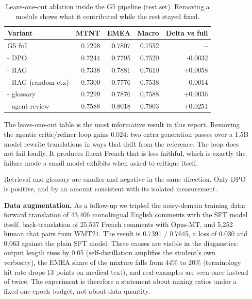 \documentclass[a4paper,12pt,oneside]{article}
\begin{document}
\begin{table}[htbp]
\centering
\small

\begin{tabular}{lrrrr}
\toprule
\textbf{Variant} & \textbf{MTNT} & \textbf{EMEA} & \textbf{Macro} & \textbf{Delta vs full} \\
\midrule
G5 full & 0.7298 & 0.7807 & 0.7552 & -- \\
- DPO & 0.7244 & 0.7795 & 0.7520 & -0.0032 \\
- RAG & 0.7338 & 0.7881 & 0.7610 & +0.0058 \\
- RAG (random ctx) & 0.7300 & 0.7776 & 0.7538 & -0.0014 \\
- glossary & 0.7299 & 0.7876 & 0.7588 & +0.0036 \\
- agent review & 0.7588 & 0.8018 & 0.7803 & +0.0251 \\
\bottomrule
\end{tabular}
\caption{Leave-one-out ablation inside the G5 pipeline (test set). Removing a module shows what it contributed while the rest stayed fixed.}
\end{table}

The leave-one-out table is the most informative result in this report. Removing the agentic
critic/refiner loop gains 0.024: two extra generation passes over a 1.5B model rewrite
translations in ways that drift from the reference. The loop does not fail loudly. It produces
fluent French that is less faithful, which is exactly the failure mode a small model exhibits
when asked to critique itself.

Retrieval and glossary are smaller and negative in the same direction. Only DPO is positive, and
by an amount consistent with its isolated measurement.

\textbf{Data augmentation.} As a follow-up we tripled the noisy-domain training data: forward
translation of 43,406 monolingual English comments with the SFT model itself, back-translation
of 25,537 French comments with Opus-MT, and 5,252 human chat pairs from WMT24. The result is
0.7391 / 0.7645, a loss of 0.030 and 0.063 against the plain SFT model. Three causes are
visible in the diagnostics: output length rises by 0.05 (self-distillation amplifies the
student's own verbosity), the EMEA share of the mixture falls from 44\% to 20\% (terminology hit
rate drops 13 points on medical text), and real examples are seen once instead of twice. The
experiment is therefore a statement about mixing ratios under a fixed one-epoch budget, not
about data quantity.
\end{document}

